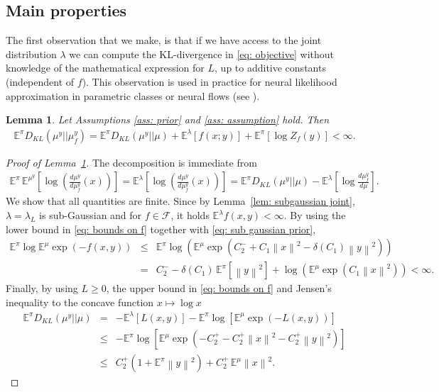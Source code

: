 \documentclass{amsart}
\newtheorem{lemma}[theorem]{Lemma}
\theoremstyle{definition}
\newcommand{\E}{{\mathbb E}}
\newcommand{\norm}[1]{\left\|#1\right\|}
\newcommand{\F}{\mathcal{F}}
\newcommand{\KL}[2]{D_{KL}\left(#1 || #2\right)}
\begin{document}
\subsection{Main properties}

The first observation that we make, is that if we have access to the joint distribution $\lambda$ we can compute the KL-divergence in \eqref{eq: objective} without knowledge of the mathematical expression for $L$, up to additive constants (independent of $f$). This observation is used in practice for neural likelihood approximation in parametric classes or neural flows (see \cite{papamakarios2019sequantialneural, radev2020bayesflowlearningcomplexstochastic}).
\begin{lemma}\label{lem: basic lemma}
    Let Assumptions  \ref{ass: prior} and \ref{ass: assumption} hold. Then 
    \begin{eqnarray*}
         \E^\pi\KL{\mu^y}{\mu^y_f}
     =  \E^\pi \KL{\mu^y}{\mu} + \E^{\lambda}[f(x;y)] + \E^\pi[\log Z_f(y)]< \infty.
    \end{eqnarray*}
\end{lemma}
\begin{proof}[Proof of Lemma~\ref{lem: basic lemma}]
The decomposition is immediate from
    \begin{eqnarray*}
         \E^\pi \, \E^{\mu^y} \left[\log\left( \frac{d \mu^y}{d \mu^y_f}(x) \right) \right]  = \E^\lambda \left[\log\left( \frac{d \mu^y}{d \mu^y_f}(x) \right) \right]
         = \E^\pi \KL{\mu^y}{\mu} - \E^\lambda \left[\log \frac{d \mu^y_f}{d\mu} \right].
    \end{eqnarray*}
    We show that all quantities are finite. Since by Lemma~\ref{lem: subgaussian joint}, $\lambda = \lambda_L$ is sub-Gaussian and for $f \in \F$, it holds
   $\E^\lambda f(x, y) <  \infty$.
    By using the lower bound in \eqref{eq: bounds on f} together with \eqref{eq: sub gaussian prior},
    \begin{eqnarray*}
         \E^\pi \log \E^{\mu}\exp(-f(x, y))
        & \le & \E^\pi \log \left(\E^\mu \exp\left(C_2^- + C_1 \norm{x}^2 - \delta(C_1) \norm{y}^2 \right) \right) \\
        & = & C_2^- - \delta(C_1) \, \E^\pi \left[\norm{y}^2\right] + \log \left(\E^\mu \exp(C_1 \norm{x}^2) \right) < \infty.
    \end{eqnarray*}
    Finally, by using $L \ge 0$, the upper bound in \eqref{eq: bounds on f} and Jensen's inequality to the concave function $x\mapsto \log x$
    \begin{eqnarray*}
        \E^\pi \KL{\mu^y}{\mu} & = & -\E^\lambda  \left[L(x, y)\right] - \E^\pi \log \left[  \E^\mu \exp\left( -L(x, y)\right) \right]  \\
        & \le  & - \E^\pi \log \left[\E^\mu \exp\left(-C_2^+ -C_2^+ \norm{x}^2-C_2^+ \norm{y}^2\right)\right] \\
        & \le & C_2^+  (1+\E^\pi \norm{y}^2)  + C_2^+ \, \E^\mu \norm{x}^2. 
    \end{eqnarray*}
\end{proof}
\end{document}
